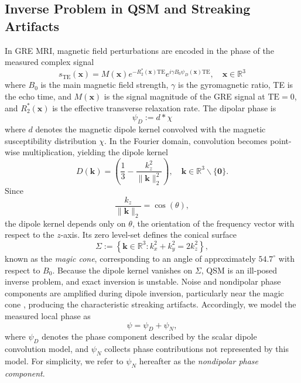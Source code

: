 \documentclass{article}
\newcommand{\R}{\mathbb{R}}
\newcommand{\bk}{\bm{k}}
\newcommand{\bx}{\bm{x}}
\begin{document}
\subsection{Inverse Problem in QSM and Streaking Artifacts}\label{sec:theoryQSM}
In GRE MRI, magnetic field perturbations are encoded in the phase of the measured complex signal
\begin{equation}
    s_{\text{TE}}(\bx) = M(\bx)e^{-R_{2}^{*}(\bx)\text{TE}}e^{i\gamma B_{0}\psi_{D}(\bx) \text{TE}}, \quad \bx\in\R^{3}
\end{equation}
\noindent
where $B_0$ is the main magnetic field strength, $\gamma$ is the gyromagnetic ratio, TE is the echo time, and $M(\bx)$ is the signal magnitude of the GRE signal at $\text{TE}=0$, and $R_{2}^{*}(\bx)$ is the effective transverse relaxation rate. The dipolar phase is
\begin{equation}
\psi_{D}:=d*\chi
\end{equation}
\noindent
where $d$ denotes the magnetic dipole kernel convolved with the magnetic susceptibility distribution $\chi$.
In the Fourier domain, convolution becomes point-wise multiplication, yielding the dipole kernel
\begin{equation}
    D(\bk) =\left(\frac{1}{3}-\frac{k_{z}^{2}}{\|\bk\|_{2}^{2}}\right), \quad \bk\in \R^{3}\backslash\{\bm{0}\}.
\end{equation}
Since
\begin{equation}
\frac{k_z}{\|\bk\|_{2}} = \cos(\theta),
\end{equation}
\noindent
the dipole kernel depends only on $\theta$, the orientation of the frequency vector with respect to the $z$-axis. Its zero level-set defines the conical surface
\begin{equation}
\label{eqn:char}
\Sigma :=
\left\{
\bk\in\mathbb{R}^{3} :
k_x^2+k_y^2=2k_z^2
\right\},
\end{equation}
\noindent
known as the \emph{magic cone}, corresponding to an angle of approximately $54.7^\circ$ with respect to $B_0$.
Because the dipole kernel vanishes on $\Sigma$, QSM is an ill-posed inverse problem, and exact inversion is unstable. Noise and nondipolar phase components are amplified during dipole inversion, particularly near the magic cone \cite{zhou2017dipole}, producing the characteristic streaking artifacts.
Accordingly, we model the measured local phase as
\begin{equation}
\psi=\psi_D+\psi_N,
\end{equation}
\noindent
where $\psi_D$ denotes the phase component described by the scalar dipole convolution model, and $\psi_N$ collects phase contributions not represented by this model. For simplicity, we refer to $\psi_N$ hereafter as the \emph{nondipolar phase component}.
\end{document}
